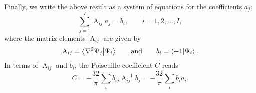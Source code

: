 \documentclass[11pt, a4paper]{article}
\newcommand{\diff}{\mathop{}\!\mathrm{d}} %
\newcommand{\eqtext}[1]{\qquad \text{#1} \qquad}
\newcommand{\mat}[1]{\mathbf{#1}}
\newcommand{\A}{\operatorname{A}}  %
\renewcommand{\laplacian}{\nabla^{2}}
\newcommand{\Pois}{Poiseuille\xspace}  %
\begin{document}
Finally, we write the above result as a system of equations for the coefficients $ a_{j} $:
\begin{equation*}
	\sum_{j=1}^{I} \A_{ij}a_{j} = b_{i}, \qquad i = 1, 2, \ldots, I,
\end{equation*}
where the matrix elements $ \A_{ij} $ are given by
\begin{equation*}
	\A_{ij} = \ip{\laplacian \Psi_{j}}{\Psi_{i}} \eqtext{and} b_{i} = \ip{-1}{\Psi_{i}}.
\end{equation*}
In terms of $ \A_{ij} $ and $ b_{i} $, the \Pois coefficient $ C $ reads
\begin{equation}
	C = - \frac{32}{\pi}\sum_{i}b_{ij}\A_{ij}^{-1}b_{j} = - \frac{32}{\pi}\sum_{i}b_{i}a_{i}. \label{gal:eq:C}
\end{equation}

\iffalse 
Using vector calculus identities, we can show
\begin{align*}
	\A_{ij} &= (\Delta \psi_{j}, \psi_{i}) \equiv \int \Delta \psi_{j} \psi_{i} \diff V = \int_{V} \nabla \cdot \big[ \nabla \psi_{j} \psi_{i} \big] \diff V - \int_{V}\big[\nabla  \psi_{j} \cdot \nabla \psi_{i} \big] \diff V\\
	& = 0 - \int_{V}\big[\nabla  \psi_{j} \cdot \nabla \psi_{i} \big] \diff V
\end{align*}
where $ \int_{V} \nabla \cdot \big[ \nabla \psi_{j} \psi_{i} \big] \diff V = 0 $ in the last equality holds because of the homogeneous boundary conditions on $ \Psi_{i} $. We end up with
\begin{equation*}
	\A_{ij} = - \int_{V}\big[\nabla  \psi_{j} \cdot \nabla \psi_{i} \big] \diff V
\end{equation*}
Evidently, the matrix $ \mat{A} $ is symmetric, which invites the use of efficient numerical methods.
\fi
\end{document}
